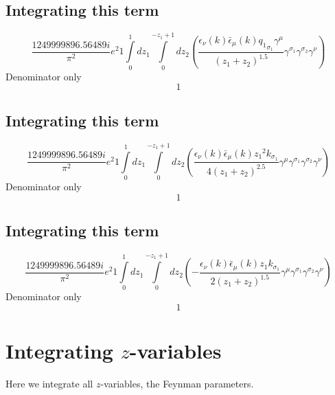 \subsection*{Integrating this term}
\begin{dmath}\frac{1249999896.56489 i}{\pi^{2}} e^{2}1\int\limits_{ 0 }^{ 1 } d{ z_{ 1 } }\int\limits_{ 0 }^{ - { z_{ 1 } } + 1 } d{ z_{ 2 } }\left(\frac{\epsilon_{ \nu }({ k }) \bar{\epsilon}_{ \mu }({ k }) { { q_1 }_{ \sigma_1 } } { \gamma^{ \mu } }}{\left({ z_{ 1 } } + { z_{ 2 } }\right)^{1.5}} { \gamma^{ \sigma_1 } } { \gamma^{ \sigma_2 } } { \gamma^{ \nu } }\right)\end{dmath}
Denominator only
\begin{dmath}1\end{dmath}
\subsection*{Integrating this term}
\begin{dmath}\frac{1249999896.56489 i}{\pi^{2}} e^{2}1\int\limits_{ 0 }^{ 1 } d{ z_{ 1 } }\int\limits_{ 0 }^{ - { z_{ 1 } } + 1 } d{ z_{ 2 } }\left(\frac{\epsilon_{ \nu }({ k }) \bar{\epsilon}_{ \mu }({ k }) { z_{ 1 } }^{2} { { k }_{ \sigma_1 } }}{4 \left({ z_{ 1 } } + { z_{ 2 } }\right)^{2.5}} { \gamma^{ \mu } } { \gamma^{ \sigma_1 } } { \gamma^{ \sigma_2 } } { \gamma^{ \nu } }\right)\end{dmath}
Denominator only
\begin{dmath}1\end{dmath}
\subsection*{Integrating this term}
\begin{dmath}\frac{1249999896.56489 i}{\pi^{2}} e^{2}1\int\limits_{ 0 }^{ 1 } d{ z_{ 1 } }\int\limits_{ 0 }^{ - { z_{ 1 } } + 1 } d{ z_{ 2 } }\left(- \frac{\epsilon_{ \nu }({ k }) \bar{\epsilon}_{ \mu }({ k }) { z_{ 1 } } { { k }_{ \sigma_1 } }}{2 \left({ z_{ 1 } } + { z_{ 2 } }\right)^{1.5}} { \gamma^{ \mu } } { \gamma^{ \sigma_1 } } { \gamma^{ \sigma_2 } } { \gamma^{ \nu } }\right)\end{dmath}
Denominator only
\begin{dmath}1\end{dmath}
\section*{Integrating $z$-variables}
Here we integrate all $z$-variables, the Feynman parameters.
